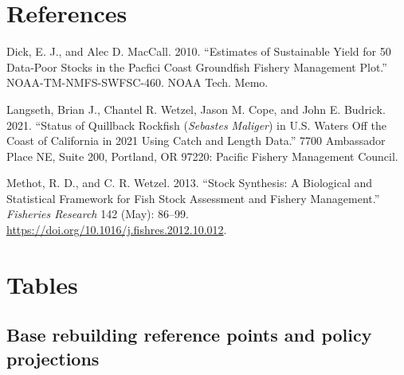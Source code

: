 \documentclass[11pt,
  english,
  a4paper,
]{article}
\begin{document}
\hypertarget{references}{%
\section{References}\label{references}}

\leavevmode\tagmcend\tagstructend


\hypertarget{refs}{}
\leavevmode\hypertarget{ref-DickandMacCall_dbsra_2010}{}%
Dick, E. J., and Alec D. MacCall. 2010. ``Estimates of Sustainable Yield for 50 Data-Poor Stocks in the Pacfici Coast Groundfish Fishery Management Plot.'' NOAA-TM-NMFS-SWFSC-460. NOAA Tech. Memo.

\leavevmode\hypertarget{ref-Langseth_status_2021}{}%
Langseth, Brian J., Chantel R. Wetzel, Jason M. Cope, and John E. Budrick. 2021. ``Status of Quillback Rockfish (\emph{Sebastes Maliger}) in U.S. Waters Off the Coast of California in 2021 Using Catch and Length Data.'' 7700 Ambassador Place NE, Suite 200, Portland, OR 97220: Pacific Fishery Management Council.

\leavevmode\hypertarget{ref-methot_stock_2013}{}%
Methot, R. D., and C. R. Wetzel. 2013. ``Stock Synthesis: A Biological and Statistical Framework for Fish Stock Assessment and Fishery Management.'' \emph{Fisheries Research} 142 (May): 86--99. \url{https://doi.org/10.1016/j.fishres.2012.10.012}.

\leavevmode\tagmcend\tagstructend

\clearpage


\hypertarget{tables}{%
\section{Tables}\label{tables}}

\leavevmode\tagmcend\tagstructend


\hypertarget{base-rebuilding-reference-points-and-policy-projections}{%
\subsection{Base rebuilding reference points and policy projections}\label{base-rebuilding-reference-points-and-policy-projections}}

\leavevmode\tagmcend\tagstructend
\end{document}
